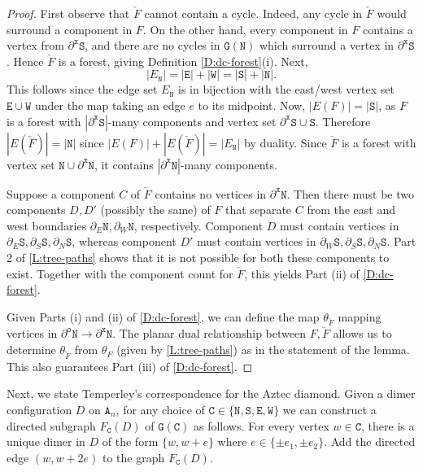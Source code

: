 \documentclass[11pt,twoside]{amsart}
\theoremstyle{plain}
\numberwithin{quest}{section}
\theoremstyle{remark}
\numberwithin{rem}{section}
\theoremstyle{definition}
\renewcommand{\tt}[1]{{\mathtt{#1}}}
\begin{document}
	\begin{proof}
		First observe that $\check F$ cannot contain a cycle. Indeed, any cycle in $\check F$ would surround a component in $F$. On the other hand, every component in $F$ contains a vertex from $\partial^\tt{x} \tt{S}$, and there are no cycles in $\tt{G}(\tt{N})$ which surround a vertex in $\partial^\tt{x} \tt{S}$. Hence $\check F$ is a forest, giving Definition \ref{D:dc-forest}(i). Next, 
		$$
		|E_\tt{N}| = |\tt{E}| + |\tt{W}| =|\tt{S}| +  |\tt{N}|.
		$$
		This follows since the edge set $E_\tt{N}$ is in bijection with the east/west vertex set $\tt{E} \cup \tt{W}$ under the map taking an edge $e$ to its midpoint. Now, $|E(F)| = |\tt{S}|$, as $F$ is a forest with $|\partial^\tt{x} \tt{S}|$-many components and vertex set $\partial^\tt{x} \tt{S} \cup \tt{S}$. Therefore $|E(\check F)| = |\tt{N}|$ since $|E(F)| + |E(\check F)| = |E_\tt{N}|$ by duality. Since $\check F$ is a forest with vertex set $\tt{N} \cup \partial^\tt{x}\tt{N}$, it contains $|\partial^\tt{x}\tt{N}|$-many components. 
		
		Suppose a component $C$ of $\check F$ contains no vertices in $\partial^\tt{x}\tt{N}$. Then there must be two components $D, D'$ (possibly the same) of $F$ that separate $C$ from the east and west boundaries $\partial_E \tt{N}, \partial_W \tt{N}$, respectively. Component $D$ must contain vertices in $\partial_E \tt{S}, \partial_S \tt{S},\partial_N \tt{S}$, whereas component $D'$ must contain vertices in $\partial_W \tt{S}, \partial_S \tt{S},\partial_N \tt{S}$. Part 2 of \cref{L:tree-paths} shows that it is not possible for both these components to exist. Together with the component count for $\check F$, this yields Part (ii) of \cref{D:dc-forest}.
		
		Given Parts (i) and (ii) of \cref{D:dc-forest}, we can define the map $\theta_{\check F}$ mapping vertices in $\partial^\tt{o} \tt{N} \to \partial^\tt{x} \tt{N}$. The planar dual relationship between $F, \check F$ allows us to determine $\theta_{\check F}$ from $\theta_F$ (given by \cref{L:tree-paths}) as in the statement of the lemma. This also guarantees Part (iii) of \cref{D:dc-forest}.
	\end{proof}
	
	
	
		
	Next, we state Temperley's correspondence for the Aztec diamond. Given a dimer configuration $D$ on $\tt{A}_n$, for any choice of $\tt{C} \in \{\tt{N}, \tt{S}, \tt{E}, \tt{W}\}$ we can construct a directed subgraph $F_{\tt{C}}(D)$ of $\tt{G}(\tt{C})$ as follows. For every vertex $w \in \tt{C}$, there is a unique dimer in $D$ of the form $\{w, w + e\}$ where $e \in \{\pm e_1, \pm e_2\}$. Add the directed edge $(w, w + 2 e)$ to the graph $F_{\tt{C}}(D)$. 
	
\end{document}
